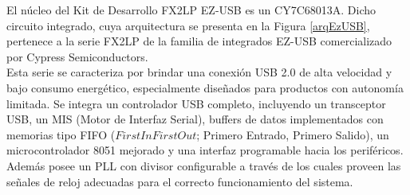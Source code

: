 	El núcleo del Kit de Desarrollo FX2LP EZ-USB es un CY7C68013A. Dicho circuito integrado, cuya arquitectura se presenta en la Figura \ref{arqEzUSB}, pertenece a la serie FX2LP de la familia de integrados EZ-USB comercializado por Cypress Semiconductors.\\
	
	Esta serie se caracteriza por brindar una conexión USB 2.0 de alta velocidad y bajo consumo energético, especialmente diseñados para productos con autonomía limitada. Se integra un controlador USB completo, incluyendo un transceptor USB, un MIS (Motor de Interfaz Serial), buffers de datos implementados con memorias tipo FIFO (\(First In First Out\); Primero Entrado, Primero Salido), un microcontrolador 8051 mejorado y una interfaz programable hacia los periféricos. Además posee un PLL con divisor configurable a través de los cuales proveen las señales de reloj adecuadas para el correcto funcionamiento del sistema.\\
	
